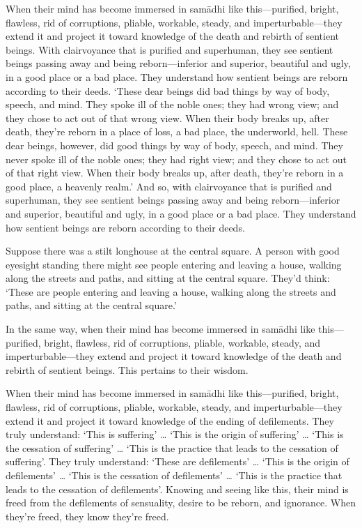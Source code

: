 \documentclass[12pt,openany]{book}%
\begin{document}
When their mind has become immersed in \textsanskrit{samādhi} like this—purified, bright, flawless, rid of corruptions, pliable, workable, steady, and imperturbable—they extend it and project it toward knowledge of the death and rebirth of sentient beings. With clairvoyance that is purified and superhuman, they see sentient beings passing away and being reborn—inferior and superior, beautiful and ugly, in a good place or a bad place. They understand how sentient beings are reborn according to their deeds. ‘These dear beings did bad things by way of body, speech, and mind. They spoke ill of the noble ones; they had wrong view; and they chose to act out of that wrong view. When their body breaks up, after death, they’re reborn in a place of loss, a bad place, the underworld, hell. These dear beings, however, did good things by way of body, speech, and mind. They never spoke ill of the noble ones; they had right view; and they chose to act out of that right view. When their body breaks up, after death, they’re reborn in a good place, a heavenly realm.’ And so, with clairvoyance that is purified and superhuman, they see sentient beings passing away and being reborn—inferior and superior, beautiful and ugly, in a good place or a bad place. They understand how sentient beings are reborn according to their deeds. 

Suppose there was a stilt longhouse at the central square. A person with good eyesight standing there might see people entering and leaving a house, walking along the streets and paths, and sitting at the central square. They’d think: ‘These are people entering and leaving a house, walking along the streets and paths, and sitting at the central square.’ 

In the same way, when their mind has become immersed in \textsanskrit{samādhi} like this—purified, bright, flawless, rid of corruptions, pliable, workable, steady, and imperturbable—they extend and project it toward knowledge of the death and rebirth of sentient beings. This pertains to their wisdom. 

When their mind has become immersed in \textsanskrit{samādhi} like this—purified, bright, flawless, rid of corruptions, pliable, workable, steady, and imperturbable—they extend it and project it toward knowledge of the ending of defilements. They truly understand: ‘This is suffering’ … ‘This is the origin of suffering’ … ‘This is the cessation of suffering’ … ‘This is the practice that leads to the cessation of suffering’. They truly understand: ‘These are defilements’ … ‘This is the origin of defilements’ … ‘This is the cessation of defilements’ … ‘This is the practice that leads to the cessation of defilements’. Knowing and seeing like this, their mind is freed from the defilements of sensuality, desire to be reborn, and ignorance. When they’re freed, they know they’re freed. 
\end{document}
